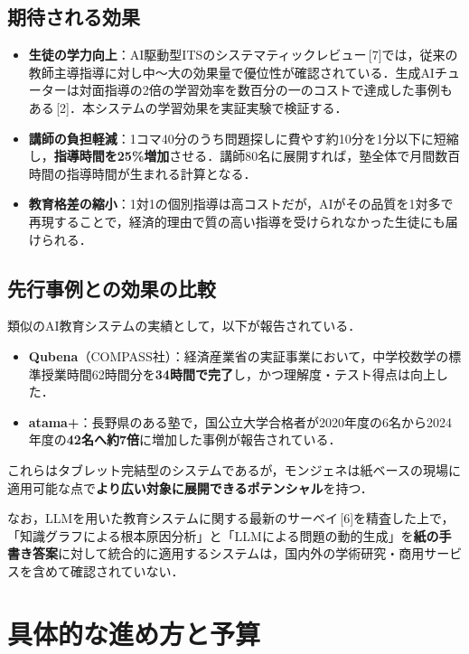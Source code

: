 \documentclass[paper=a4,fontsize=10.5bp,jafontsize=10.5bp,twocolumn]{jlreq}
\begin{document}
\subsection{期待される効果}

\begin{itemize}
  \item \textbf{生徒の学力向上}：AI駆動型ITSのシステマティックレビュー\,[7]では，従来の教師主導指導に対し中〜大の効果量で優位性が確認されている．生成AIチューターは対面指導の2倍の学習効率を数百分の一のコストで達成した事例もある\,[2]．本システムの学習効果を実証実験で検証する．
  \item \textbf{講師の負担軽減}：1コマ40分のうち問題探しに費やす約10分を1分以下に短縮し，\textbf{指導時間を25\%増加}させる．講師80名に展開すれば，塾全体で月間数百時間の指導時間が生まれる計算となる．
  \item \textbf{教育格差の縮小}：1対1の個別指導は高コストだが，AIがその品質を1対多で再現することで，経済的理由で質の高い指導を受けられなかった生徒にも届けられる．
\end{itemize}

\subsection{先行事例との効果の比較}

類似のAI教育システムの実績として，以下が報告されている．
\begin{itemize}
  \item \textbf{Qubena}（COMPASS社）：経済産業省の実証事業において，中学校数学の標準授業時間62時間分を\textbf{34時間で完了}し，かつ理解度・テスト得点は向上した．
  \item \textbf{atama+}：長野県のある塾で，国公立大学合格者が2020年度の6名から2024年度の\textbf{42名へ約7倍}に増加した事例が報告されている．
\end{itemize}

これらはタブレット完結型のシステムであるが，モンジェネは紙ベースの現場に適用可能な点で\textbf{より広い対象に展開できるポテンシャル}を持つ．

なお，LLMを用いた教育システムに関する最新のサーベイ\,[6]を精査した上で，「知識グラフによる根本原因分析」と「LLMによる問題の動的生成」を\textbf{紙の手書き答案}に対して統合的に適用するシステムは，国内外の学術研究・商用サービスを含めて確認されていない．

\section{具体的な進め方と予算}
\end{document}
